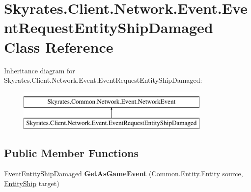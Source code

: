 \hypertarget{class_skyrates_1_1_client_1_1_network_1_1_event_1_1_event_request_entity_ship_damaged}{\section{Skyrates.\-Client.\-Network.\-Event.\-Event\-Request\-Entity\-Ship\-Damaged Class Reference}
\label{class_skyrates_1_1_client_1_1_network_1_1_event_1_1_event_request_entity_ship_damaged}
}
Inheritance diagram for Skyrates.\-Client.\-Network.\-Event.\-Event\-Request\-Entity\-Ship\-Damaged\-:\begin{figure}[H]
\begin{center}
\leavevmode
\includegraphics[height=2.000000cm]{class_skyrates_1_1_client_1_1_network_1_1_event_1_1_event_request_entity_ship_damaged}
\end{center}
\end{figure}
\subsection*{Public Member Functions}
\begin{DoxyCompactItemize}
\item 
\hypertarget{class_skyrates_1_1_client_1_1_network_1_1_event_1_1_event_request_entity_ship_damaged_a20305bfb7f9e9e58479c3dc66701a59b}{\hyperlink{class_skyrates_1_1_client_1_1_game_1_1_event_1_1_event_entity_ship_damaged}{Event\-Entity\-Ship\-Damaged} {\bfseries Get\-As\-Game\-Event} (\hyperlink{class_skyrates_1_1_common_1_1_entity_1_1_entity}{Common.\-Entity.\-Entity} source, \hyperlink{class_skyrates_1_1_common_1_1_entity_1_1_entity_ship}{Entity\-Ship} target)}\label{class_skyrates_1_1_client_1_1_network_1_1_event_1_1_event_request_entity_ship_damaged_a20305bfb7f9e9e58479c3dc66701a59b}

\end{DoxyCompactItemize}

